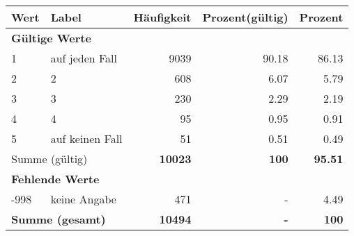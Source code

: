      \begin{longtable}{lXrrr}
     \toprule
     \textbf{Wert} & \textbf{Label} & \textbf{Häufigkeit} & \textbf{Prozent(gültig)} & \textbf{Prozent} \\
     \endhead
     \midrule
     \multicolumn{5}{l}{\textbf{Gültige Werte}}\\

     1 &
     \multicolumn{1}{X}{ auf jeden Fall   } &


       \num{9039} &
       \num[round-mode=places,round-precision=2]{90.18} &
         \num[round-mode=places,round-precision=2]{86.13} \\

     2 &
     \multicolumn{1}{X}{ 2   } &


       \num{608} &
       \num[round-mode=places,round-precision=2]{6.07} &
         \num[round-mode=places,round-precision=2]{5.79} \\

     3 &
     \multicolumn{1}{X}{ 3   } &


       \num{230} &
       \num[round-mode=places,round-precision=2]{2.29} &
         \num[round-mode=places,round-precision=2]{2.19} \\

     4 &
     \multicolumn{1}{X}{ 4   } &


       \num{95} &
       \num[round-mode=places,round-precision=2]{0.95} &
         \num[round-mode=places,round-precision=2]{0.91} \\

     5 &
     \multicolumn{1}{X}{ auf keinen Fall   } &


       \num{51} &
       \num[round-mode=places,round-precision=2]{0.51} &
         \num[round-mode=places,round-precision=2]{0.49} \\
     \midrule
     \multicolumn{2}{l}{Summe (gültig)} &
       \textbf{\num{10023}} &
     \textbf{\num{100}} &
       \textbf{\num[round-mode=places,round-precision=2]{95.51}} \\
     \multicolumn{5}{l}{\textbf{Fehlende Werte}}\\
       -998 &
       keine Angabe &
         \num{471} &
        - &
         \num[round-mode=places,round-precision=2]{4.49} \\
     \midrule
     \multicolumn{2}{l}{\textbf{Summe (gesamt)}} &
          \textbf{\num{10494}} &
        \textbf{-} &
        \textbf{\num{100}} \\
     \bottomrule
     \end{longtable}
     
